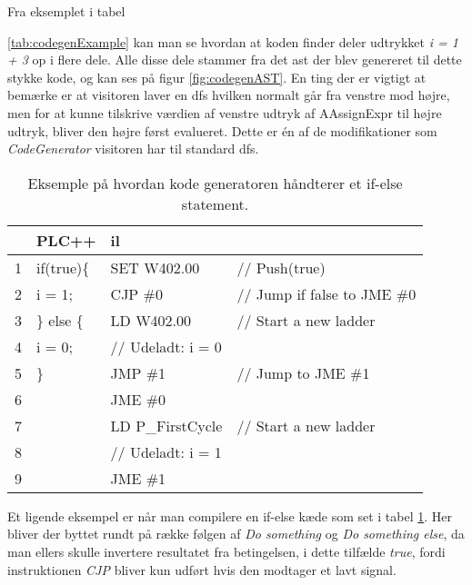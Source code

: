 \noindent Fra eksemplet i tabel {\ref{tab:codegenExample} kan man se hvordan at koden finder deler udtrykket \textit{i = 1 + 3} op i flere dele. Alle disse dele stammer fra det \gls{ast} der blev genereret til dette stykke kode, og kan ses på figur \ref{fig:codegenAST}. En ting der er vigtigt at bemærke er at visitoren laver en \gls{dfs} hvilken normalt går fra venstre mod højre, men for at kunne tilskrive værdien af venstre udtryk af AAssignExpr til højre udtryk, bliver den højre først evalueret. Dette er én af de modifikationer som \textit{CodeGenerator} visitoren har til standard \gls{dfs}.


\begin{table}[H]
    \centering\ttfamily
    \begin{tabular}{l|l|l l}
         &PLC++                 & \gls{il} \\\hline
        1&if(true)\{            & SET W402.00       &// Push(true)\\
        2&  i = 1;              & CJP \#0           &// Jump if false to JME \#0\\
        3&\} else \{            & LD W402.00        &// Start a new ladder\\
        4&  i = 0;              & // Udeladt: i = 0\\
        5& \}                   & JMP \#1           &// Jump to JME \#1\\
        6&                      & JME \#0           &\\
        7&                      & LD P\_FirstCycle  &// Start a new ladder\\
        8&                      & // Udeladt: i = 1\\
        9&                      & JME \#1
    \end{tabular}
    \caption{Eksemple på hvordan kode generatoren håndterer et if-else statement.}
    \label{tab:codegenIf}
\end{table}

\noindent Et ligende eksempel er når man compilere en if-else kæde som set i tabel \ref{tab:codegenIf}. Her bliver der byttet rundt på række følgen af \textit{Do something} og \textit{Do something else}, da man ellers skulle invertere resultatet fra betingelsen, i dette tilfælde \textit{true}, fordi instruktionen \textit{CJP} bliver kun udført hvis den modtager et lavt signal.

}
